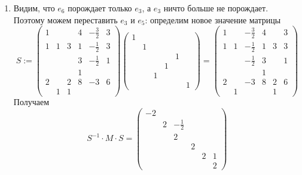 \documentclass[12pt,a4paper]{article}
\begin{document}
\begin{problem*}
\begin{enumerate}
            \item Видим, что $e_6$ порождает только $e_3$, а $e_3$ ничто больше не порождает. Поэтому можем переставить $e_3$ и $e_5$: определим новое значение матрицы
                \[
                    S :=
                    \begin{pmatrix}
                        1&&& 4& -\frac{3}{2}& 3\\
                        1& 1& 3& 1& -\frac{1}{2}& 3\\
                        &&& 3& -\frac{1}{2}& 1\\
                        &&& 1&&\\
                        2&& 2& 8& -3& 6\\
                        & 1& 1&&&
                    \end{pmatrix}
                    \begin{pmatrix}
                        1&&&&&\\
                        &1&&&&\\
                        &&&&1&\\
                        &&&1&&\\
                        &&1&&&\\
                        &&&&&1
                    \end{pmatrix}
                    =
                    \begin{pmatrix}
                        1&& -\frac{3}{2}& 4&& 3\\
                        1& 1& -\frac{1}{2}& 1& 3& 3\\
                        && -\frac{1}{2}& 3&& 1\\
                        &&& 1&&\\
                        2&& -3& 8& 2& 6\\
                        & 1&&& 1&
                    \end{pmatrix}
                \]
                Получаем
                \[
                    S^{-1} \cdot M \cdot S =
                    \begin{pmatrix}
                        -2&&&&&\\
                        &2& -\frac{1}{2}&&&\\
                        &&2&&&\\
                        &&&2&&\\
                        &&&&2&1\\
                        &&&&&2 
                    \end{pmatrix}
                \]


\end{enumerate}
\end{problem*}
\end{document}
